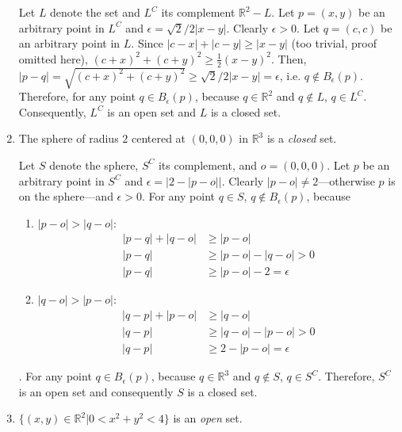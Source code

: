 \documentclass{homework}
\begin{document}
\begin{problem}{5}
\begin{enumerate}
Let $L$ denote the set and $L^C$ its complement $\mathbb{R}^2 - L$. Let $p = (x, y)$ be an arbitrary point in $L^C$ and $\epsilon = \sqrt{2}/2|x - y|$. Clearly $\epsilon > 0$. Let  $q = (c, c)$ be an arbitrary point in $L$. Since $|c - x| + |c - y| \geq |x - y|$ (too trivial, proof omitted here), $(c + x)^2 + (c + y)^2 \geq \frac{1}{2}(x - y)^2$. Then, $|p - q| = \sqrt{(c + x)^2 + (c + y)^2} \geq \sqrt{2}/2|x - y| = \epsilon$, i.e. $q \notin B_{\epsilon}(p)$. Therefore, for any point $q \in B_{\epsilon}(p)$, because $q \in \mathbb{R}^2$ and $q \notin L$, $q \in L^C$. Consequently, $L^C$ is an open set and $L$ is a closed set. \QED

\item The sphere of radius $2$ centered at $(0, 0, 0)$ in $\mathbb{R}^3$ is a \emph{closed} set.

Let $S$ denote the sphere, $S^C$ its complement, and $o = (0, 0, 0)$. Let $p$ be an arbitrary point in $S^C$ and $\epsilon = |2 - |p - o||$. Clearly $|p - o| \neq 2$---otherwise $p$ is on the sphere---and $\epsilon > 0$. For any point $q \in S$, $q \notin B_{\epsilon}(p)$, because
\begin{enumerate}
\item $|p - o| > |q - o|$:
\begin{align*}
  |p - q| + |q - o| & \geq |p - o| \\
  |p - q| & \geq |p - o| - |q - o| > 0 \\
  |p - q| & \geq |p - o| - 2 = \epsilon
\end{align*}

\item $|q - o| > |p - o|$:
\begin{align*}
  |q - p| + |p - o| & \geq |q - o| \\
  |q - p| & \geq |q - o| - |p - o| > 0 \\
  |q - p| & \geq 2 - |p - o| = \epsilon
\end{align*}
\end{enumerate}
. For any point $q \in B_{\epsilon}(p)$, because $q \in \mathbb{R}^3$ and $q \notin S$, $q \in S^C$. Therefore, $S^C$ is an open set and consequently $S$ is a closed set. \QED

\item $\{(x, y) \in \mathbb{R}^2 | 0 < x^2 + y^2 < 4\}$ is an \emph{open} set.


\end{enumerate}
\end{problem}
\end{document}
